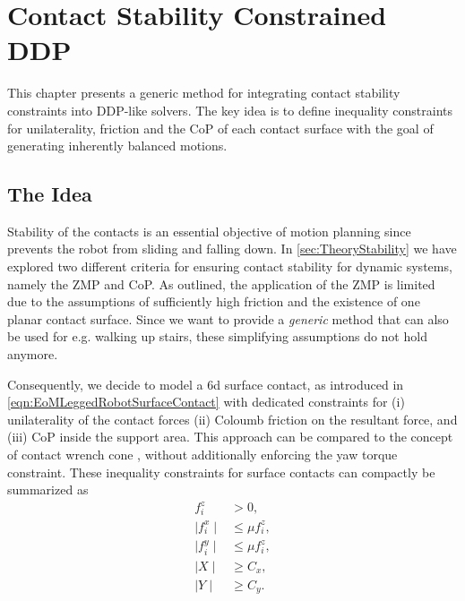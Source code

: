 
\chapter{Contact Stability Constrained DDP}\label{c3}
This chapter presents a generic method for integrating contact stability constraints into DDP-like solvers. The key idea is to define inequality constraints for unilaterality, friction and the \gls{CoP} of each contact surface with the goal of generating inherently balanced motions.

\section{The Idea}\label{sec:StabilityIdea}
Stability of the contacts is an essential objective of motion planning since prevents the robot from sliding and falling down. In \cref{sec:TheoryStability} we have explored two different criteria for ensuring contact stability for dynamic systems, namely the \gls{ZMP} and \gls{CoP}. As outlined, the application of the \gls{ZMP} is limited due to the assumptions of sufficiently high friction and the existence of one planar contact surface. Since we want to provide a \textit{generic} method that can also be used for e.g. walking up stairs, these simplifying assumptions do not hold anymore. 

Consequently, we decide to model a 6d surface contact, as introduced in \ref{eqn:EoMLeggedRobotSurfaceContact} with dedicated constraints for (i) unilaterality of the contact forces (ii) Coloumb friction on the resultant force, and (iii) \gls{CoP} inside the support area. This approach can be compared to the concept of contact wrench cone \cite{caron2015stability}, without additionally enforcing the yaw torque constraint. These inequality constraints for surface contacts can compactly be summarized as
\begin{subequations}\label{eqn:contractWrenchConeReduced}
\begin{align}
f_i^z &> 0 \label{subeqn:stabilityUnilaterality},\\
\mid f_i^x\mid &\leq \mu f_i^z \label{subeqn:stabilityFrictionX},\\
\mid f_i^y\mid &\leq \mu f_i^z \label{subeqn:stabilityFrictionY},\\
\mid X\mid & \geq C_x \label{subeqn:stabilityCoPPitch},\\
\mid Y\mid & \geq C_y \label{subeqn:stabilityCoPRoll}.
\end{align}
\end{subequations}

